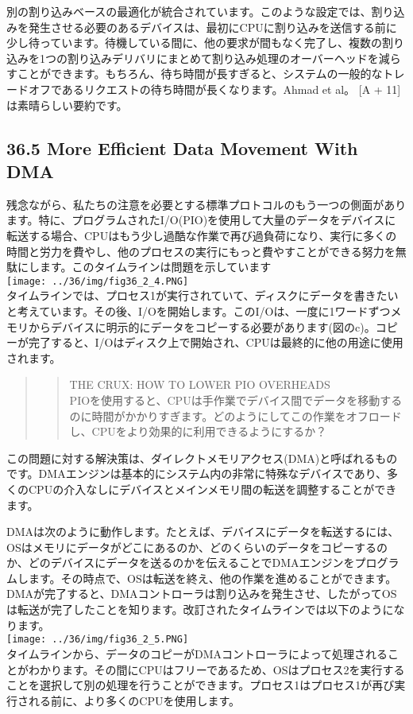 別の割り込みベースの最適化が統合されています。このような設定では、割り込みを発生させる必要のあるデバイスは、最初にCPUに割り込みを送信する前に少し待っています。待機している間に、他の要求が間もなく完了し、複数の割り込みを1つの割り込みデリバリにまとめて割り込み処理のオーバーヘッドを減らすことができます。もちろん、待ち時間が長すぎると、システムの一般的なトレードオフであるリクエストの待ち時間が長くなります。Ahmad
et al。 {[}A + 11{]}は素晴らしい要約です。

\hypertarget{more-efficient-data-movement-with-dma}{%
\subsection*{36.5 More Efficient Data Movement With
DMA}\label{more-efficient-data-movement-with-dma}}

残念ながら、私たちの注意を必要とする標準プロトコルのもう一つの側面があります。特に、プログラムされたI/O(PIO)を使用して大量のデータをデバイスに転送する場合、CPUはもう少し過酷な作業で再び過負荷になり、実行に多くの時間と労力を費やし、他のプロセスの実行にもっと費やすことができる努力を無駄にします。このタイムラインは問題を示しています\\
\texttt{[image: ../36/img/fig36\_2\_4.PNG]}\\
タイムラインでは、プロセス1が実行されていて、ディスクにデータを書きたいと考えています。その後、I/Oを開始します。このI/Oは、一度に1ワードずつメモリからデバイスに明示的にデータをコピーする必要があります(図のc)。コピーが完了すると、I/Oはディスク上で開始され、CPUは最終的に他の用途に使用されます。

\begin{quote}
\begin{quote}
THE CRUX: HOW TO LOWER PIO OVERHEADS\\
PIOを使用すると、CPUは手作業でデバイス間でデータを移動するのに時間がかかりすぎます。どのようにしてこの作業をオフロードし、CPUをより効果的に利用できるようにするか？
\end{quote}
\end{quote}

この問題に対する解決策は、ダイレクトメモリアクセス(DMA)と呼ばれるものです。DMAエンジンは基本的にシステム内の非常に特殊なデバイスであり、多くのCPUの介入なしにデバイスとメインメモリ間の転送を調整することができます。

DMAは次のように動作します。たとえば、デバイスにデータを転送するには、OSはメモリにデータがどこにあるのか、どのくらいのデータをコピーするのか、どのデバイスにデータを送るのかを伝えることでDMAエンジンをプログラムします。その時点で、OSは転送を終え、他の作業を進めることができます。DMAが完了すると、DMAコントローラは割り込みを発生させ、したがってOSは転送が完了したことを知ります。改訂されたタイムラインでは以下のようになります。\\
\texttt{[image: ../36/img/fig36\_2\_5.PNG]}\\
タイムラインから、データのコピーがDMAコントローラによって処理されることがわかります。その間にCPUはフリーであるため、OSはプロセス2を実行することを選択して別の処理を行うことができます。プロセス1はプロセス1が再び実行される前に、より多くのCPUを使用します。

